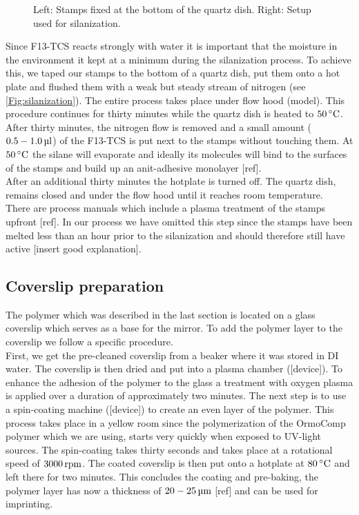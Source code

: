 \begin{figure}[H]
	\caption{Left: Stamps fixed at the bottom of the quartz dish. Right: Setup used for silanization.}
	\label{Fig:silanization}
\end{figure}
Since F13-TCS reacts strongly with water it is important that the moisture in the environment it kept at a minimum during the silanization process. To achieve this, we taped our stamps to the bottom of a quartz dish, put them onto a hot plate and flushed them with a weak but steady stream of nitrogen (see \autoref{Fig:silanization}). The entire process takes place under flow hood (model). This procedure continues for thirty minutes while the quartz dish is heated to $50\degrees$.\\
After thirty minutes, the nitrogen flow is removed and a small amount ($0.5-1.0\ul$) of the F13-TCS is put next to the stamps without touching them. At $50\degrees$ the silane will evaporate and ideally its molecules will bind to the surfaces of the stamps and build up an anit-adhesive monolayer [ref].\\
After an additional thirty minutes the hotplate is turned off. The quartz dish, remains closed and under the flow hood until it reaches room temperature.\\
There are process manuals which include a plasma treatment of the stamps upfront [ref]. In our process we have omitted this step since the stamps have been melted less than an hour prior to the silanization and should therefore still have active [insert good explanation].

\subsection{Coverslip preparation}
The polymer which was described in the last section is located on a glass coverslip which serves as a base for the mirror. To add the polymer layer to the coverslip we follow a specific procedure.\\
First, we get the pre-cleaned coverslip from a beaker where it was stored in DI water. The coverslip is then dried and put into a plasma chamber ([device]). To enhance the adhesion of the polymer to the glass a treatment with oxygen plasma is applied over a duration of approximately two minutes. The next step is to use a spin-coating machine ([device]) to create an even layer of the polymer. This process takes place in a yellow room since the polymerization of the OrmoComp polymer which we are using, starts very quickly when exposed to UV-light sources. The spin-coating takes thirty seconds and takes place at a rotational speed of $3000\rpm$. The coated coverslip is then put onto a hotplate at $80\degrees$ and left there for two minutes. This concludes the coating and pre-baking, the polymer layer has now a thickness of $20-25\um$ [ref] and can be used for imprinting.

